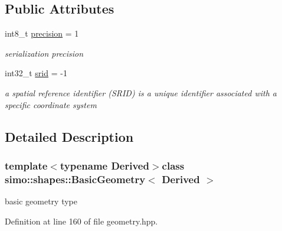 \subsection*{Public Attributes}
\begin{DoxyCompactItemize}
\item 
\hypertarget{classsimo_1_1shapes_1_1_basic_geometry_ae4429e3d4c999289a0d7ae706e6ddcf7}{int8\-\_\-t \hyperlink{classsimo_1_1shapes_1_1_basic_geometry_ae4429e3d4c999289a0d7ae706e6ddcf7}{precision} = 1}\label{classsimo_1_1shapes_1_1_basic_geometry_ae4429e3d4c999289a0d7ae706e6ddcf7}

\begin{DoxyCompactList}\small\item\em serialization precision \end{DoxyCompactList}\item 
\hypertarget{classsimo_1_1shapes_1_1_basic_geometry_aaf510a85f9f8ec7160637c73f88b2c6a}{int32\-\_\-t \hyperlink{classsimo_1_1shapes_1_1_basic_geometry_aaf510a85f9f8ec7160637c73f88b2c6a}{srid} = -\/1}\label{classsimo_1_1shapes_1_1_basic_geometry_aaf510a85f9f8ec7160637c73f88b2c6a}

\begin{DoxyCompactList}\small\item\em a spatial reference identifier (S\-R\-I\-D) is a unique identifier associated with a specific coordinate system \end{DoxyCompactList}\end{DoxyCompactItemize}


\subsection{Detailed Description}
\subsubsection*{template$<$typename Derived$>$class simo\-::shapes\-::\-Basic\-Geometry$<$ Derived $>$}

basic geometry type 

Definition at line 160 of file geometry.\-hpp.



